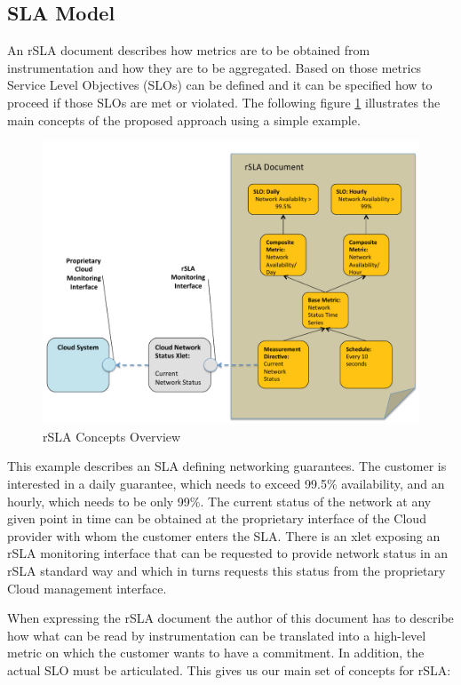 
\subsection{SLA Model}

An rSLA document describes how metrics are to be obtained from instrumentation and how they are to be aggregated. Based on those metrics Service Level Objectives (SLOs) can be defined and it can be specified how to proceed if those SLOs are met or violated. 
The following figure \ref{fig:concepts} illustrates the main concepts of the proposed approach using a simple example.

\begin{figure}[H]
\centering
 \includegraphics[width=\textwidth]{pics/concepts.pdf} 
 \caption{rSLA Concepts Overview}
 \label{fig:concepts}
\end{figure}

This example describes an SLA defining networking guarantees. The customer is interested in a daily guarantee, which needs to exceed 99.5\% availability, and an hourly, which needs to be only 99\%. The current status of the network at any given point in time can be obtained at the proprietary interface of the Cloud provider with whom the customer enters the SLA. There is an xlet exposing an rSLA monitoring interface that can be requested to provide network status in an rSLA standard way and which in turns requests this status from the proprietary Cloud management interface. 

When expressing the rSLA document the author of this document has to describe how what can be read by instrumentation can be translated into a high-level metric on which the customer wants to have a commitment. In addition, the actual SLO must be articulated. This gives us our main set of concepts for rSLA:


